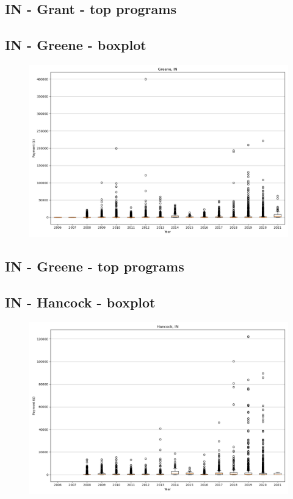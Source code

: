 \subsection*{IN - Grant - top programs}

\newpage
\subsection*{IN - Greene - boxplot}
\begin{figure}[h]
\centering
\includegraphics[width=7in]{../output/boxplots/counties/Greene-IN_boxplot.png}
\end{figure}


\subsection*{IN - Greene - top programs}

\newpage
\subsection*{IN - Hancock - boxplot}
\begin{figure}[h]
\centering
\includegraphics[width=7in]{../output/boxplots/counties/Hancock-IN_boxplot.png}
\end{figure}



